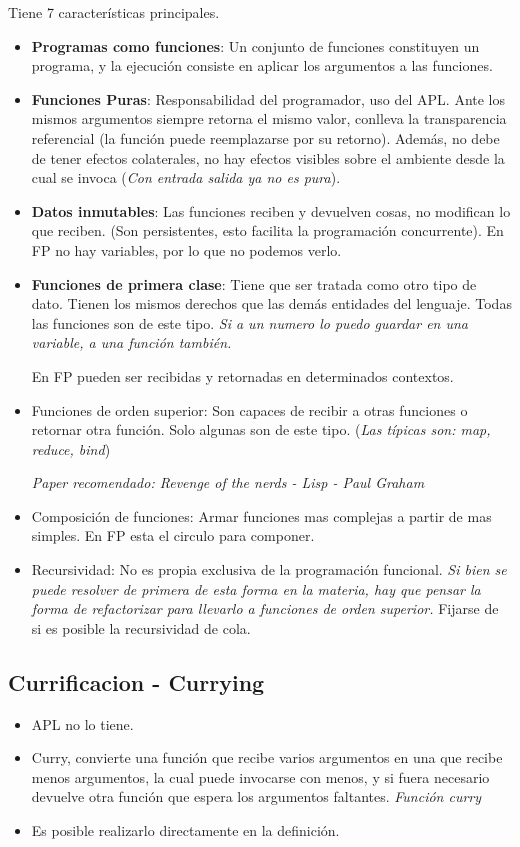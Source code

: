 Tiene 7 características principales.
\begin{itemize}
    \item \textbf{Programas como funciones}: Un conjunto de funciones constituyen un programa, y la ejecución consiste en aplicar los argumentos a las funciones.
    \item \textbf{Funciones Puras}: Responsabilidad del programador, uso del APL. Ante los mismos argumentos siempre retorna el mismo valor, conlleva la transparencia referencial (la función puede reemplazarse por su retorno). Además, no debe de tener efectos colaterales, no hay efectos visibles sobre el ambiente desde la cual se invoca (\textit{Con entrada salida ya no es pura}).
    \item \textbf{Datos inmutables}: Las funciones reciben y devuelven cosas, no modifican lo que reciben. (Son persistentes, esto facilita la programación concurrente). En FP no hay variables, por lo que no podemos verlo.
    \item \textbf{Funciones de primera clase}: Tiene que ser tratada como otro tipo de dato. Tienen los mismos derechos que las demás entidades del lenguaje. Todas las funciones son de este tipo. \textit{Si a un numero lo puedo guardar en una variable, a una función también.}
    
    En FP pueden ser recibidas y retornadas en determinados contextos.
    
    \item Funciones de orden superior: Son capaces de recibir a otras funciones o retornar otra función. Solo algunas son de este tipo. (\textit{Las típicas son: map, reduce, bind})
    
    
    \textit{Paper recomendado: Revenge of the nerds - Lisp - Paul Graham}
    \item Composición de funciones: Armar funciones mas complejas a partir de mas simples.
    En FP esta el circulo para componer.
    
    \item Recursividad: No es propia exclusiva de la programación funcional. \textit{Si bien se puede resolver de primera de esta forma en la materia, hay que pensar la forma de refactorizar para llevarlo a funciones de orden superior.} Fijarse de si es posible la recursividad de cola.
\end{itemize}

\subsection*{Currificacion - Currying}

\begin{itemize}
    \item APL no lo tiene.
    \item Curry, convierte una función que recibe varios argumentos en una que recibe menos argumentos, la cual puede invocarse con menos, y si fuera necesario devuelve otra función que espera los argumentos faltantes. \textit{Función curry}
    \item Es posible realizarlo directamente en la definición.
\end{itemize}
